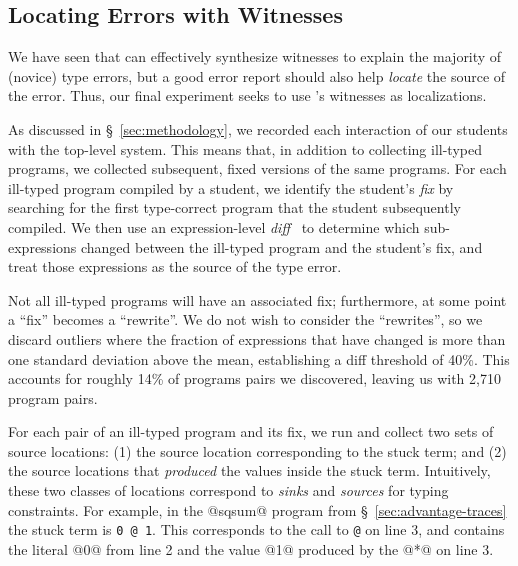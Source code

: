 
\subsection{Locating Errors with Witnesses}
\label{sec:locating}

We have seen that \toolname can effectively synthesize witnesses to
explain the majority of (novice) type errors, but a good error report
should also help \emph{locate} the source of the error.
%
Thus, our final experiment seeks to use \toolname's witnesses as
localizations.


As discussed in \S~\ref{sec:methodology}, we recorded
each interaction of our students with the \ocaml top-level system.
%
This means that, in addition to collecting ill-typed programs, we
collected subsequent, fixed versions of the same programs.
%
For each ill-typed program compiled by a student, we identify the student's
\emph{fix} by searching for the first type-correct program that the student
subsequently compiled.
%
We then use an expression-level \emph{diff}~\cite{Lempsink2009-xf} to
determine which sub-expressions changed between the ill-typed program
and the student's fix, and treat those expressions as the source of the
type error.

Not all ill-typed programs will have an associated fix; furthermore,
at some point a ``fix'' becomes a ``rewrite''.
%
We do not wish to consider the ``rewrites'', so we discard outliers
where the fraction of expressions that have changed is more than one
standard deviation above the mean, establishing a diff threshold of
40\%.
%
This accounts for roughly 14\% of programs pairs we discovered, leaving
us with 2,710 program pairs.

For each pair of an ill-typed program and its fix, we run \toolname and
collect two sets of source locations:
%
(1) the source location corresponding to the stuck term; and
%
(2) the source locations that \emph{produced} the values inside the
stuck term.
%
Intuitively, these two classes of locations correspond to \emph{sinks}
and \emph{sources} for typing constraints.
%
For example, in the @sqsum@ program from \S~\ref{sec:advantage-traces}
the stuck term is \verb!0 @ 1!.
%
This corresponds to the call to \verb!@! on line 3, and contains
the literal @0@ from line 2 and the value @1@ produced by the
@*@ on line 3.

